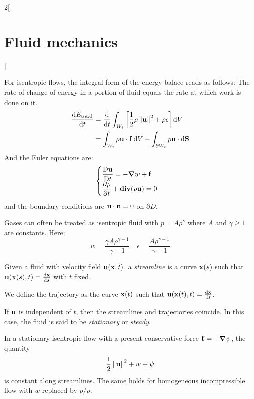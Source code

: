 \documentclass[../../../main_physics.tex]{subfiles}
\begin{document}
\begin{multicols}{2}[\section{Fluid mechanics}]
\begin{remark}
  \end{remark}
  \begin{theorem}
    For isentropic flows, the integral form of the energy balace reads as follows: The rate of change of energy in a portion of fluid equals the rate at which work is done on it.
    \begin{align*}
      \dv{E_\mathrm{total}}{t} & =\dv{}{t}\int_{W_t}\left[\frac{1}{2} \rho\left\|\boldsymbol{\mathrm{u}}\right\|^2+\rho \epsilon\right]\dd{V} \\
                               & =\int_{W_t}\rho\boldsymbol{\mathrm{u}}\cdot \boldsymbol{\mathrm{f}} \dd{V}-\int_{\partial W_t}p\boldsymbol{\mathrm{u}}\cdot\dd{\boldsymbol{\mathrm{S}}}
    \end{align*}
    And the Euler equations are:
    $$
      \begin{cases}
        \displaystyle\frac{\mathrm{D}\boldsymbol{\mathrm{u}}}{\mathrm{D}t}= -\grad w + \boldsymbol{\mathrm{f}} \\
        \displaystyle\pdv{\rho}{t}+\operatorname{\boldsymbol{\mathrm{div}}}(\rho\boldsymbol{\mathrm{u}})=0
      \end{cases}
    $$
    and the boundary conditions are $\boldsymbol{\mathrm{u}}\cdot\boldsymbol{\mathrm{n}}=0$ on $\partial D$.
  \end{theorem}
  \begin{remark}
    Gases can often be treated as isentropic fluid with $p=A\rho^\gamma$ where $A$ and $\gamma\geq 1$ are constants. Here:
    $$
      w = \frac{\gamma A \rho^{\gamma-1}}{\gamma-1}\quad \epsilon = \frac{A\rho^{\gamma-1}}{\gamma-1}
    $$
  \end{remark}
  \begin{definition}
    Given a fluid with velocity field $\boldsymbol{\mathrm{u}}(\boldsymbol{\mathrm{x}}, t)$, a \emph{streamline} is a curve $\boldsymbol{\mathrm{x}}(s)$ such that $\boldsymbol{\mathrm{u}}(\boldsymbol{\mathrm{x}}(s), t)=\dv{\boldsymbol{\mathrm{x}}}{s}$ with $t$ fixed.
  \end{definition}
  \begin{definition}
    We define the trajectory as the curve $\boldsymbol{\mathrm{x}}(t)$ such that $\boldsymbol{\mathrm{u}}(\boldsymbol{\mathrm{x}}(t), t)=\dv{\boldsymbol{\mathrm{x}}}{t}$.
  \end{definition}
  \begin{remark}
    If $\boldsymbol{\mathrm{u}}$ is independent of $t$, then the streamlines and trajectories coincide. In this case, the fluid is said to be \emph{stationary} or \emph{steady}.
  \end{remark}
  \begin{theorem}
    In a stationary isentropic flow with a present conservative force $\boldsymbol{\mathrm{f}}=-\grad\psi$, the quantity
    $$
      \frac{1}{2}\left\|\boldsymbol{\mathrm{u}}\right\|^2+w+\psi
    $$
    is constant along streamlines. The same holds for homogeneous incompressible flow with $w$ replaced by $p/\rho$.

\end{theorem}
\end{multicols}
\end{document}
